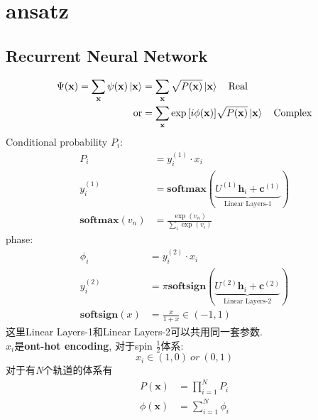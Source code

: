 \section{ansatz}
\subsection{Recurrent Neural Network}
\begin{equation}
    \begin{split}
    \Psi(\mathbf{x}) = \sum_{\mathbf{x}}\psi(\mathbf{x})\ket{\mathbf{x}} &= \sum_{\mathbf{x}}\sqrt{P(\mathbf{x})}\ket{\mathbf{x}} \quad \text{Real} \\
    \text{or} & = \sum_{\mathbf{x}}\exp{[i\phi(\mathbf{x})]}\sqrt{P(\mathbf{x})}\ket{\mathbf{x}} \quad \text{Complex}
    \end{split}
\end{equation}
Conditional probability\cite{HibatAllah2020} $P_i$:
\begin{equation}
    \begin{split}
    P_i& = y_i^{(1)} \cdot x_i \\
    y_i^{(1)} & = \mathbf{softmax}(\underbrace{U^{(1)}\mathbf{h}_i + \mathbf{c}^{(1)}}_{\text{Linear Layers-1}}) \\
    \mathbf{softmax}(v_n) & = \frac{\exp{(v_n)}}{\sum_i \exp{(v_i)}}
    \end{split}
\end{equation}
phase:
\begin{equation}
    \begin{split}
    \phi_i & = y_i^{(2)} \cdot x_i \\
    y_i^{(2)} & = \pi \mathbf{softsign}(\underbrace{U^{(2)}\mathbf{h}_i + \mathbf{c}^{(2)}}_{\text{Linear Layers-2}}) \\
    \mathbf{softsign}(x) & = \frac{x}{1 + x} \in (-1, 1)
    \end{split}
\end{equation}
这里Linear Layers-1和Linear Layers-2可以共用同一套参数.\\
$x_i$是\textbf{ont-hot encoding}, 对于spin $\frac{1}{2}$体系:
\begin{equation}
    x_i \in (1, 0) \ or \ (0, 1)
\end{equation}
对于有\textit{N}个轨道的体系有
\begin{equation}
    \begin{split}
    P(\mathbf{x}) & = \prod_{i=1}^N P_i\\
    \phi(\mathbf{x}) &= \sum_{i=1}^N \phi_i
    \end{split}
\end{equation}


